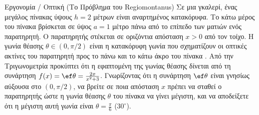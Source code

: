 \begin{problhma}{Εργονομία / Οπτική (Το Πρόβλημα του Regiomontanus)}
Σε μια γκαλερί, ένας μεγάλος πίνακας ύψους $h=2$ μέτρων είναι αναρτημένος κατακόρυφα. Το κάτω μέρος του πίνακα βρίσκεται σε ύψος $a=1$ μέτρο πάνω από το επίπεδο των ματιών ενός παρατηρητή. Ο παρατηρητής στέκεται σε οριζόντια απόσταση $x > 0$ από τον τοίχο. Η γωνία θέασης $\theta \in (0, \pi/2)$ είναι η κατακόρυφη γωνία που σχηματίζουν οι οπτικές ακτίνες του παρατηρητή προς το πάνω και το κάτω άκρο του πίνακα \cite{maor1998trigonometric}.
Από την Τριγωνομετρία προκύπτει ότι η εφαπτομένη της γωνίας θέασης δίνεται από τη συνάρτηση $f(x) = \ef\theta = \frac{2x}{x^2 + 3}$.
Γνωρίζοντας ότι η συνάρτηση $\ef\theta$ είναι γνησίως αύξουσα στο $(0, \pi/2)$, να βρείτε σε ποια απόσταση $x$ πρέπει να σταθεί ο παρατηρητής ώστε η γωνία θέασης $\theta$ του πίνακα να γίνει μέγιστη, και να αποδείξετε ότι η μέγιστη αυτή γωνία είναι $\theta = \frac{\pi}{6}$  ($30^\circ$).

\begin{center}
\end{center}
\end{problhma}
